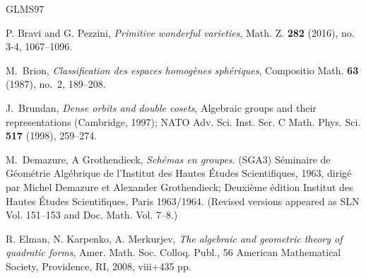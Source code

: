 \documentclass[12pt]{amsart}
\numberwithin{equation}{section}
\theoremstyle{definition}
\begin{document}
\begin{thebibliography}{GLMS97}

 P. Bravi and G. Pezzini,%
  \emph{Primitive wonderful varieties}, Math. Z. \textbf{282} (2016),
  no. 3-4, 1067--1096.

 M.~Brion, \emph{Classification des espaces
    homogènes sphériques}, Compositio Math. \textbf{63} (1987), no.~2,
  189--208.



 J.~Brundan, \emph{Dense orbits and double cosets},
  Algebraic groups and their representations (Cambridge, 1997); NATO
  Adv. Sci. Inst. Ser. C Math. Phys. Sci. \textbf{517} (1998),
  259--274.



 M.~Demazure, A
  Grothendieck, \emph{Schémas en groupes}. (SGA3) Séminaire de
  Géométrie Algébrique de l'Institut des Hautes Études Scientifiques,
  1963, dirigé par Michel Demazure et Alexander Grothendieck; Deuxième
  édition Institut des Hautes Études Scientifiques, Paris 1963/1964.
  (Revised versions appeared as SLN Vol. 151--153 and Doc. Math.
  Vol. 7--8.)


 R. Elman, N. Karpenko, A. Merkurjev, \emph{The
    algebraic and geometric theory of quadratic forms},
  Amer. Math. Soc. Colloq. Publ., 56 American Mathematical Society,
  Providence, RI, 2008, viii+435 pp.


\end{thebibliography}
\end{document}
